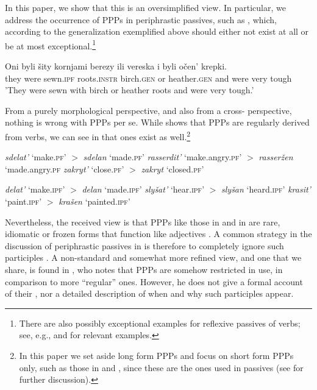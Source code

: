 \documentclass[output=paper,modfonts,newtxmath,hidelinks
\ChapterDOI{10.5281/zenodo.2545513}
]{langscibook}
\begin{document}
\noindent In this paper, we show that this is an oversimplified view. In particular, we address the occurrence of  PPPs in  periphrastic passives, such as , which, according to the generalization exemplified above should either not exist at all or be at most exceptional.\footnote{There are also possibly exceptional examples for reflexive passives of  verbs; see, e.g., \citet{schoorlemmer95} and \citet{fehrmann+10} for relevant examples.} 

\ea\gll Oni byli šity kornjami berezy ili vereska i byli očen' krepki.\\
	they were sewn.\textsc{ipf} roots.\textsc{instr} birch.\textsc{gen} or heather.\textsc{gen} and were very tough\\
\glt	'They were sewn with birch or heather roots and were very tough.' \label{sity}
\z

\noindent From a purely morphological perspective, and also from a cross- perspective, nothing is wrong with  PPPs per se. While  shows that PPPs are regularly derived from  verbs, we can see in  that  ones exist as well.\footnote{In this paper we set aside long form PPPs and focus on short form PPPs only, such as those in  and , since these are the ones used in passives (see \citealt{borik14} for further discussion).}

\ea\label{pfppp}
\ea \textit{sdelat'} `make.\textsc{pf}' $>$ \textit{sdelan} `made.\textsc{pf}'
\ex \textit{rasserdit'} `make.angry.\textsc{pf}'  $>$ \textit{rasseržen}  `made.angry.\textsc{pf}
\ex \textit{zakryt'} `close.\textsc{pf}' $>$ \textit{zakryt} `closed.\textsc{pf}'
\z\z

\ea\label{ipfppp}
\ea \textit{delat'} `make.\textsc{ipf}' $>$ \textit{delan} `made.\textsc{ipf}'
\ex \textit{slyšat'} `hear.\textsc{ipf}' $>$ \textit{slyšan} `heard.\textsc{ipf}'
\ex \textit{krasit'} `paint.\textsc{ipf}' $>$ \textit{krašen} `painted.\textsc{ipf}'
\z\z

\noindent Nevertheless, the received view is that  PPPs like those in  and in  are rare, idiomatic or frozen forms that function like adjectives \citep[e.g.][]{svedova80, schoorlemmer95}.  A common strategy in the discussion of periphrastic passives in  is therefore to completely ignore such participles \citep{babbybrecht75, paslawskastechow}. A non-standard and somewhat more refined view, and one that we share, is found in \citet{knjazev07}, who notes that  PPPs are somehow restricted in use, in comparison to more ``regular''  ones. However, he does not give a formal account of their , nor a detailed description of when and why such participles appear.
\end{document}
